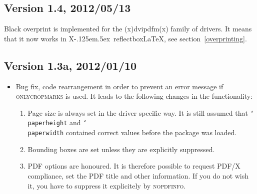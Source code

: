 \documentclass[11pt]{article}
\def\opt#1{\texorpdfstring{\textmd{\textsc{#1}}}{#1}}
\DeclareRobustCommand\cmd[1]{\texttt{\char`\\#1}}
\DeclareRobustCommand\XeLaTeX{X\kern-.125em\lower.5ex\hbox{\csname
              reflectbox\endcsname{E}}\LaTeX}
\begin{document}
\subsection{Version 1.4, 2012/05/13}
Black overprint is implemented for the (x)dvipdfm(x) family of drivers. It means that it now works
in \XeLaTeX, see section~\ref{overprinting}.

\subsection{Version 1.3a, 2012/01/10}
\begin{itemize}
\item Bug fix, code rearrangement in order to prevent an error message if \opt{onlycropmarks} is
used. It leads to the following changes in the functionality:
\begin{enumerate}
\item Page size is always set in the driver specific way. It is still assumed that
\cmd{paperheight} and \cmd{paperwidth} contained correct values before the package was loaded.
\item Bounding boxes are set unless they are explicitly suppressed.
\item PDF options are honoured. It is therefore possible to request PDF/X compliance, set the PDF
title and other information. If you do not wish it, you have to suppress it explicitely by
\opt{nopdfinfo}.
\end{enumerate}
\end{itemize}
\end{document}
